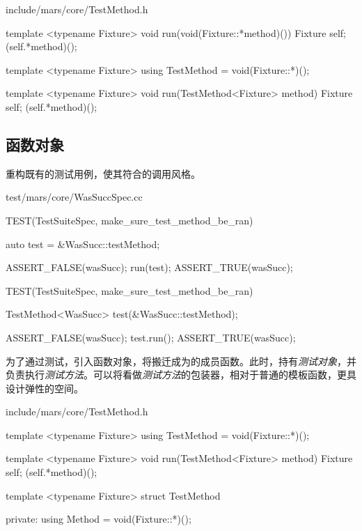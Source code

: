 \begin{content}
\begin{diff}{include/mars/core/TestMethod.h}
\begin{minicpp}
template <typename Fixture>
void run(void(Fixture::*method)()) {
  Fixture self;
  (self.*method)();
}
\end{minicpp}
\tcblower
\begin{minicpp}
template <typename Fixture>
using TestMethod = void(Fixture::*)();

template <typename Fixture>
void run(TestMethod<Fixture> method) {
  Fixture self;
  (self.*method)();
}
\end{minicpp}
\end{diff}

\subsection{函数对象}

重构既有的测试用例，使其符合的调用风格。

\begin{diff}{test/mars/core/WasSuccSpec.cc}
\begin{minicpp}
TEST(TestSuiteSpec, make_sure_test_method_be_ran) {
  auto test = &WasSucc::testMethod;

  ASSERT_FALSE(wasSucc);
  run(test);
  ASSERT_TRUE(wasSucc);
}
\end{minicpp}
\tcblower
\begin{minicpp}
TEST(TestSuiteSpec, make_sure_test_method_be_ran) {
  TestMethod<WasSucc> test(&WasSucc::testMethod);

  ASSERT_FALSE(wasSucc);
  test.run();
  ASSERT_TRUE(wasSucc);
}
\end{minicpp}
\end{diff}

为了通过测试，引入函数对象，将搬迁成为的成员函数。此时，持有\emph{测试对象}，并负责执行\emph{测试方法}。可以将看做\emph{测试方法}的包装器，相对于普通的模板函数，更具设计弹性的空间。

\begin{diff}{include/mars/core/TestMethod.h}
\begin{minicpp}
template <typename Fixture>
using TestMethod = void(Fixture::*)();

template <typename Fixture>
void run(TestMethod<Fixture> method) {
  Fixture self;
  (self.*method)();
}
\end{minicpp}
\tcblower
\begin{minicpp}
template <typename Fixture>
struct TestMethod {
private:
  using Method = void(Fixture::*)();

}
\end{minicpp}
\end{diff}
\end{content}
